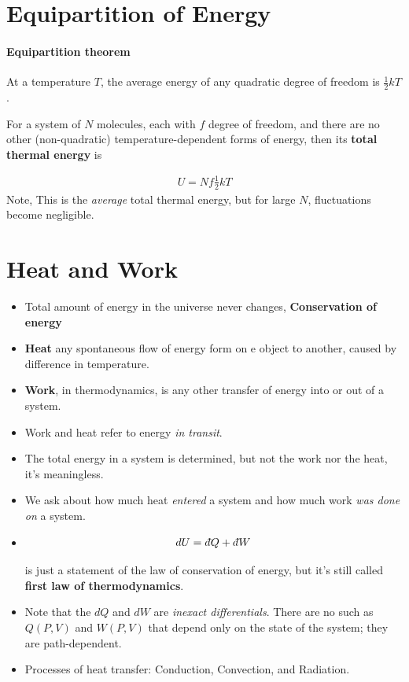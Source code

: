 \documentclass{book}
\newcommand{\dbar}{d\hspace*{-0.08em}\bar{}\hspace*{0.1em}}
\begin{document}
\section{Equipartition of Energy}%
\label{sec:equi of energy}

\paragraph{Equipartition theorem} At a temperature $T$, the average energy of any
quadratic degree of freedom is $\frac{1}{2}kT$.

For a system of $N$ molecules, each with $f$ degree of freedom, and there are no other
(non-quadratic) temperature-dependent forms of energy, then its \textbf{total thermal energy} is

\begin{align}
	U = Nf \frac{1}{2}kT
\end{align}
Note, This is the \textit{average} total thermal energy,
but for large $N$, fluctuations become negligible.


\section{Heat and Work}%
\label{sec:heat and work}

\begin{itemize}
	\item Total amount of energy in the universe never changes, \textbf{Conservation of energy}
	\item \textbf{Heat} any spontaneous flow of energy form on e object to another, caused by
	      difference in temperature.
	\item \textbf{Work}, in thermodynamics, is any other transfer of energy into or out of a system.
	\item Work and heat refer to energy \textit{in transit}.
	\item The total energy in a system is determined, but not the work nor the heat, it's meaningless.
	\item We ask about how much heat \textit{entered} a system and how much work
	      \textit{was done on} a system.
	\item
				\begin{align}
					\label{eq:1st law thermo}
					dU = \dbar Q + \dbar W
				\end{align}

	      is just a statement of the law of conservation of energy, but it's still called
	      \textbf{first law of thermodynamics}.
  \item Note that the $ dQ $ and $ dW $ are \textit{inexact differentials}. There are no such as
				$ Q(P, V) $ and $ W(P, V) $ that depend only on the state of the system; they are path-dependent.




	\item Processes of heat transfer: Conduction, Convection, and Radiation.
\end{itemize}
\end{document}
